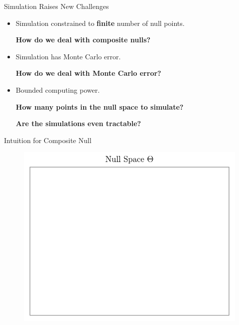 \begin{frame}{Simulation Raises New Challenges}
\begin{itemize}
    \item Simulation constrained to \textbf{finite} number of null points.
    \begin{center}
        \textbf{How do we deal with composite nulls?}
    \end{center}
    \item Simulation has Monte Carlo error. 
    \begin{center}
        \textbf{How do we deal with Monte Carlo error?}
    \end{center}
    \item Bounded computing power.
    \begin{center}
        \textbf{How many points in the null space to simulate?}
    \end{center}
    \begin{center}
        \textbf{Are the simulations even tractable?}
    \end{center}
\end{itemize}
\end{frame}

\begin{frame}{Intuition for Composite Null}
\begin{figure}
    \centering
    \includegraphics[width=0.95\linewidth]{figs/approach_1.pdf}
\end{figure} 
\end{frame}


